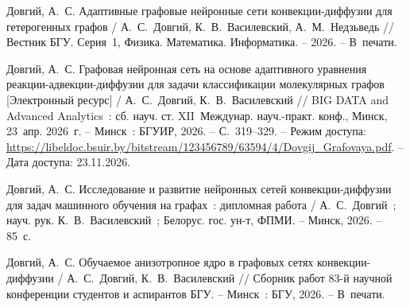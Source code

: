 {\small\sloppy

Довгий, А.~С. Адаптивные графовые нейронные сети конвекции-диффузии для гетерогенных графов / А.~С.~Довгий, К.~В.~Василевский, А.~М.~Недзьведь // Вестник БГУ. Серия~1, Физика. Математика. Информатика. -- 2026. -- В~печати.

Довгий, А.~С. Графовая нейронная сеть на основе адаптивного уравнения реакции-адвекции-диффузии для задачи классификации молекулярных графов [Электронный ресурс] / А.~С.~Довгий, К.~В.~Василевский // BIG DATA and Advanced Analytics~: сб. науч. ст. XII~Междунар. науч.-практ. конф., Минск, 23~апр. 2026~г. -- Минск~: БГУИР, 2026. -- С.~319--329. -- Режим доступа: \url{https://libeldoc.bsuir.by/bitstream/123456789/63594/4/Dovgij_Grafovaya.pdf}. -- Дата доступа: 23.11.2026.

Довгий, А.~С. Исследование и развитие нейронных сетей конвекции-диффузии для задач машинного обучения на графах~: дипломная работа / А.~С.~Довгий~; науч. рук. К.~В.~Василевский~; Белорус. гос. ун-т, ФПМИ. -- Минск, 2026. -- 85~с.

Довгий, А.~С. Обучаемое анизотропное ядро в графовых сетях конвекции-диффузии / А.~С.~Довгий, К.~В.~Василевский // Сборник работ 83-й научной конференции студентов и аспирантов БГУ. -- Минск~: БГУ, 2026. -- В~печати.

}

\newpage
